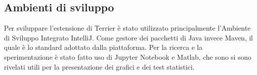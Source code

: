 \subsection{Ambienti di sviluppo}
Per sviluppare l'estensione di Terrier è stato utilizzato principalmente
l'Ambiente di Sviluppo Integrato IntelliJ.
Come gestore dei pacchetti di Java invece Maven, il quale
è lo standard adottato dalla piattaforma.
Per la ricerca e la sperimentazione è stato fatto uso di Jupyter Notebook
e Matlab, che sono si sono rivelati utili per la presentazione dei grafici
e dei test statistici.
